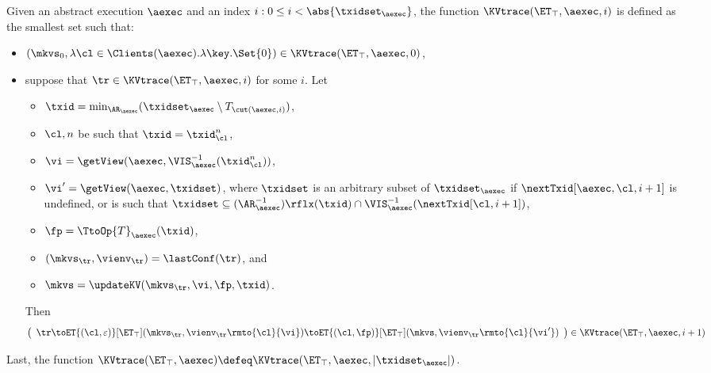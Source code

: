 \begin{definition}
\label{def:aexec2kvtrace}
Given an abstract execution $\aexec$ and an index $i : 0 \leq i < \abs{\txidset_\aexec}$, 
the function $\KVtrace(\ET_{\top}, \aexec, i)$ is defined as the smallest set such that:
\begin{itemize}
\item 
$(\mkvs_{0}, \lambda \cl \in \Clients(\aexec). \lambda \key.\Set{0}) \in \KVtrace(\ET_{\top}, \aexec, 0)$, 
\item suppose that $\tr \in \KVtrace(\ET_{\top}, \aexec, i)$ for some $i$.  
Let
\begin{itemize} 
\item $\txid = \min_{\AR_{\aexec}}(\txidset_{\aexec} \setminus T_{\cut(\aexec, i)})$, 
\item  $\cl, n$ be such that $\txid = \txid_{\cl}^{n}$, 
\item  $\vi = \getView(\aexec, \VIS^{-1}_{\aexec}(\txid_{\cl}^{n}))$, 
\item $\vi' = \getView(\aexec, \txidset)$, where $\txidset$ is an arbitrary subset of $\txidset_{\aexec}$ if 
$\nextTxid[\aexec, \cl, i+1]$ is undefined, or is such that 
$\txidset \subseteq (\AR_{\aexec}^{-1})\rflx(\txid) \cap \VIS^{-1}_{\aexec}(\nextTxid[\cl, i+1])$, 
\item $\fp = \TtoOp{T}_{\aexec}(\txid)$, 
\item $(\mkvs_{\tr}, \vienv_{\tr}) = \lastConf(\tr)$, and
\item $\mkvs = \updateKV(\mkvs_{\tr}, \vi, \fp, \txid)$.
\end{itemize}
Then
\[
\left( 
\begin{array}{l}
\tr \toET{(\cl, \varepsilon)}[\ET_{\top}] (\mkvs_{\tr}, \vienv_{\tr}\rmto{\cl}{\vi}) 
\toET{(\cl, \fp)}[\ET_{\top}] (\mkvs, \vienv_{\tr}\rmto{\cl}{\vi'}) 
\end{array}
\right) \in \KVtrace(\ET_{\top}, \aexec, i+1)
\]
\end{itemize}
Last, the function $\KVtrace(\ET_{\top}, \aexec) \defeq \KVtrace(\ET_{\top}, \aexec, \lvert \txidset_\aexec \rvert)$.
\end{definition}

